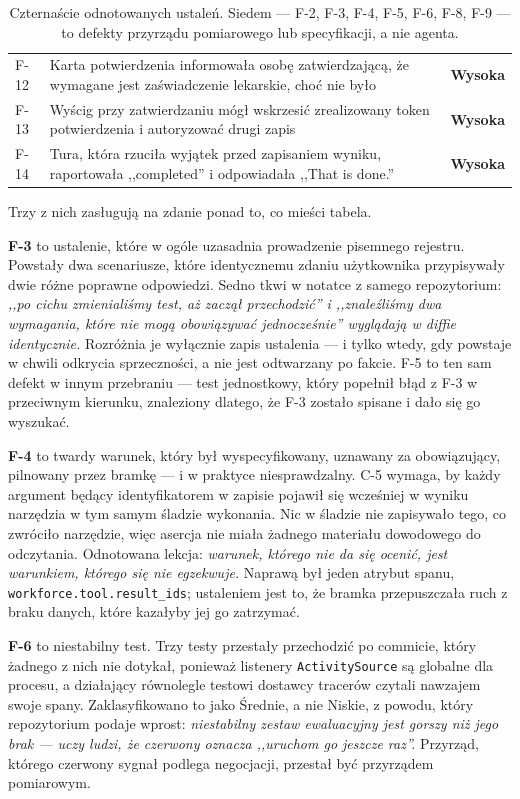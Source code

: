 \documentclass[11pt,a4paper]{article}
\newcommand{\finding}[1]{{\color{primaryblue}\textbf{#1}}}
\begin{document}
\begin{table}[htbp]
\begin{tabularx}{\textwidth}{@{}p{1.0cm}Xp{1.6cm}@{}}
F-12 & Karta potwierdzenia informowała osobę zatwierdzającą, że wymagane jest zaświadczenie lekarskie, choć nie było & \textcolor{accentred}{\textbf{Wysoka}} \\
F-13 & Wyścig przy zatwierdzaniu mógł wskrzesić zrealizowany token potwierdzenia i autoryzować drugi zapis & \textcolor{accentred}{\textbf{Wysoka}} \\
F-14 & Tura, która rzuciła wyjątek przed zapisaniem wyniku, raportowała ,,completed'' i odpowiadała ,,That is done.'' & \textcolor{accentred}{\textbf{Wysoka}} \\
\bottomrule
\end{tabularx}
\caption{Czternaście odnotowanych ustaleń. Siedem --- F-2, F-3, F-4, F-5, F-6, F-8, F-9 --- to defekty przyrządu pomiarowego lub specyfikacji, a nie agenta.}
\label{tab:findings}
\end{table}

Trzy z nich zasługują na zdanie ponad to, co mieści tabela.

\finding{F-3} to ustalenie, które w ogóle uzasadnia prowadzenie pisemnego
rejestru. Powstały dwa scenariusze, które identycznemu zdaniu użytkownika
przypisywały dwie różne poprawne odpowiedzi. Sedno tkwi w notatce z samego
repozytorium: \emph{,,po cichu zmienialiśmy test, aż zaczął przechodzić'' i
,,znaleźliśmy dwa wymagania, które nie mogą obowiązywać jednocześnie'' wyglądają
w diffie identycznie.} Rozróżnia je wyłącznie zapis ustalenia --- i tylko wtedy,
gdy powstaje w chwili odkrycia sprzeczności, a nie jest odtwarzany po fakcie. F-5
to ten sam defekt w innym przebraniu --- test jednostkowy, który popełnił błąd z
F-3 w przeciwnym kierunku, znaleziony dlatego, że F-3 zostało spisane i dało się
go wyszukać.

\finding{F-4} to twardy warunek, który był wyspecyfikowany, uznawany za
obowiązujący, pilnowany przez bramkę --- i w praktyce niesprawdzalny. C-5 wymaga,
by każdy argument będący identyfikatorem w zapisie pojawił się wcześniej w wyniku
narzędzia w tym samym śladzie wykonania. Nic w śladzie nie zapisywało tego, co
zwróciło narzędzie, więc asercja nie miała żadnego materiału dowodowego do
odczytania. Odnotowana lekcja: \emph{warunek, którego nie da się ocenić, jest
warunkiem, którego się nie egzekwuje.} Naprawą był jeden atrybut spanu,
\texttt{workforce.tool.result\_ids}; ustaleniem jest to, że bramka przepuszczała
ruch z braku danych, które kazałyby jej go zatrzymać.

\finding{F-6} to niestabilny test. Trzy testy przestały przechodzić po commicie,
który żadnego z nich nie dotykał, ponieważ listenery \texttt{ActivitySource}
są globalne dla procesu, a działający równolegle testowi dostawcy tracerów
czytali nawzajem swoje spany. Zaklasyfikowano to jako Średnie, a nie Niskie, z
powodu, który repozytorium podaje wprost: \emph{niestabilny zestaw ewaluacyjny
jest gorszy niż jego brak --- uczy ludzi, że czerwony oznacza ,,uruchom go
jeszcze raz''.} Przyrząd, którego czerwony sygnał podlega negocjacji, przestał
być przyrządem pomiarowym.
\end{document}
